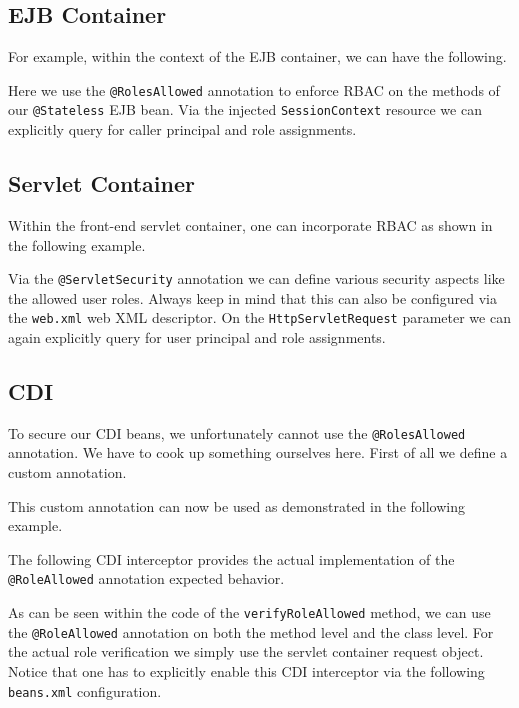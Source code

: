 \subsection{EJB Container}
For example, within the context of the EJB container, we can have the following.

Here we use the \texttt{@RolesAllowed} annotation to enforce RBAC on the methods of our \texttt{@Stateless} EJB bean.
Via the injected \texttt{SessionContext} resource we can explicitly query for caller principal and role assignments.

\subsection{Servlet Container}
Within the front-end servlet container, one can incorporate RBAC as shown in the following example.

Via the \texttt{@ServletSecurity} annotation we can define various security aspects like the allowed user roles.
Always keep in mind that this can also be configured via the \texttt{web.xml} web XML descriptor.
On the \texttt{HttpServletRequest} parameter we can again explicitly query for user principal and role assignments.

\subsection{CDI}
To secure our CDI beans, we unfortunately cannot use the \texttt{@RolesAllowed} annotation.
We have to cook up something ourselves here.
First of all we define a custom annotation.

This custom annotation can now be used as demonstrated in the following example.

The following CDI interceptor provides the actual implementation of the \texttt{@RoleAllowed} annotation expected behavior.

As can be seen within the code of the \texttt{verifyRoleAllowed} method,
we can use the \texttt{@RoleAllowed} annotation on both the method level and the class level.
For the actual role verification we simply use the servlet container request object.
Notice that one has to explicitly enable this CDI interceptor via the following \texttt{beans.xml} configuration.



